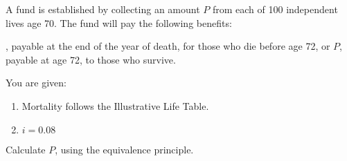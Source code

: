 A fund is established by collecting an amount $P$ from each of 100 
independent lives age 70. The fund will pay the following benefits:
\begin{description}
, payable at the end of the year of death, for those who die before 
  age 72, or
\bull $P$, payable at age 72, to those who survive.
\end{description}
You are given:
\begin{enumerate}
 \item Mortality follows the Illustrative Life Table.
 \item $i = 0.08$
\end{enumerate}
 Calculate $P$, using the equivalence principle.
